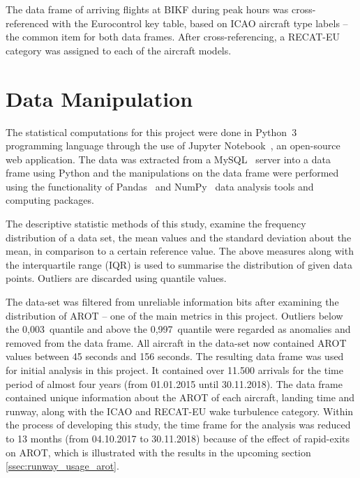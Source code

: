 The data frame of arriving flights at BIKF during peak hours was cross-referenced with the Eurocontrol key table, based on ICAO aircraft type labels -- the common item for both data frames. After cross-referencing, a RECAT-EU category was assigned to each of the aircraft models.

\section{Data Manipulation}

The statistical computations for this project were done in Python~3~\cite{python} programming language through the use of Jupyter Notebook~\cite{jupyter}, an open-source web application. The data was extracted from a MySQL~\cite{mysql} server into a data frame using Python and the manipulations on the data frame were performed using the functionality of Pandas~\cite{pandas} and NumPy~\cite{numpy} data analysis tools and computing packages.

The descriptive statistic methods of this study, examine the frequency distribution of a data set, the mean values and the standard deviation about the mean, in comparison to a certain reference value. The above measures along with the interquartile range (IQR) is used to summarise the distribution of given data points. Outliers are discarded using quantile values.

The data-set was filtered from unreliable information bits after examining the distribution of AROT -- one of the main metrics in this project. Outliers below the 0,003~quantile and above the 0,997~quantile were regarded as anomalies and removed from the data frame. All aircraft in the data-set now contained AROT values between 45 seconds and 156 seconds. The resulting data frame was used for initial analysis in this project. It contained over 11.500 arrivals for the time period of almost four years (from 01.01.2015 until 30.11.2018). The data frame contained unique information about the AROT of each aircraft, landing time and runway, along with the ICAO and RECAT-EU wake turbulence category. Within the process of developing this study, the time frame for the analysis was reduced to 13 months (from 04.10.2017 to 30.11.2018) because of the effect of rapid-exits on AROT, which is illustrated with the results in the upcoming section \ref{ssec:runway_usage_arot}.



